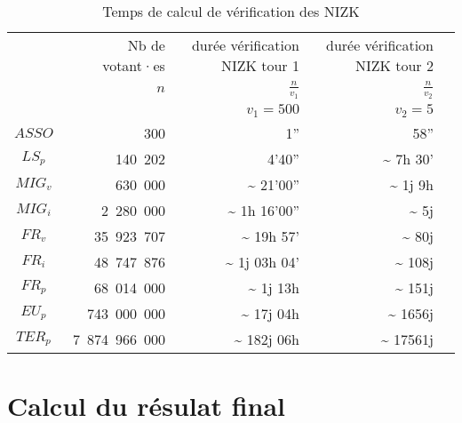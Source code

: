 \documentclass[../report]{subfiles}
\begin{document}
\begin{table}[H]
	\begin{center}
		\begin{tabular}{|c|r|r|r|r|}
			\hline
			& Nb de votant·es      &   durée vérification NIZK tour 1    &   durée vérification NIZK tour 2         \\
			& $n$                  & $\frac{n}{v_1}$                     & $\frac{n}{v_2}$ \\
			\hline
			&                      & $v_1 = 500$                         & $v_2 = 5$         \\
			\hline
			\hline
			$ASSO$  &           300 &                                 1''           &                            58''           \\
			$LS_p$  &       140~202 &                              4'40''           & \textasciitilde{}    7h 30'\phantom{27''}           \\
			$MIG_v$ &       630~000 &  \textasciitilde{}          21'00''           & \textasciitilde{} 1j 9h \phantom{00'27''}               \\
			$MIG_i$ &     2~280~000 &  \textasciitilde{}       1h 16'00''           & \textasciitilde{} 5j    \phantom{10h 00'27''}                \\
			$FR_v$  &    35~923~707 &  \textasciitilde{}      19h 57'\phantom{27''} & \textasciitilde{} 80j   \phantom{10h 00'27''}                \\
			$FR_i$  &    48~747~876 &  \textasciitilde{}   1j 03h 04'\phantom{56''} & \textasciitilde{} 108j  \phantom{10h 00'27''}                 \\
			$FR_p$  &    68~014~000 &  \textasciitilde{}   1j 13h \phantom{47'08''} & \textasciitilde{} 151j   \phantom{10h 00'27''}               \\
			$EU_p$  &   743~000~000 &  \textasciitilde{}  17j 04h \phantom{46'40''} & \textasciitilde{} 1656j  \phantom{10h 00'27''}                     \\
			$TER_p$ & 7~874~966~000 &  \textasciitilde{} 182j 06h \phantom{58'52''} & \textasciitilde{} 17561j \phantom{10h 00'27''}                \\
			\hline
		\end{tabular}
	\end{center}
	\caption{Temps de calcul de vérification des NIZK}\label{tab:verif:nizk}
\end{table}


\section{Calcul du résulat final}\label{sec:res:perf:resultat}
\end{document}
